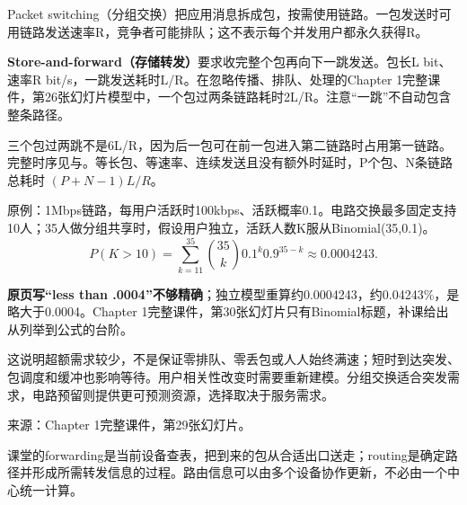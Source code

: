 



Packet switching（分组交换）把应用消息拆成包，按需使用链路。一包发送时可用链路发送速率R，竞争者可能排队；这不表示每个并发用户都永久获得R。


\textbf{Store-and-forward（存储转发）}要求收完整个包再向下一跳发送。包长L bit、速率R bit/s，一跳发送耗时L/R。在忽略传播、排队、处理的Chapter 1完整课件，第26张幻灯片模型中，一个包过两条链路耗时2L/R。注意“一跳”不自动包含整条路径。




三个包过两跳不是6L/R，因为后一包可在前一包进入第二链路时占用第一链路。完整时序见与。等长包、等速率、连续发送且没有额外时延时，P个包、N条链路总耗时 \((P+N-1)L/R\)。





原例：1Mbps链路，每用户活跃时100kbps、活跃概率0.1。电路交换最多固定支持10人；35人做分组共享时，假设用户独立，活跃人数K服从Binomial(35,0.1)。
\[
P(K>10)=\sum_{k=11}^{35}\binom{35}{k}0.1^k0.9^{35-k}\approx0.0004243.\tag{1.1}
\]


\textbf{原页写“less than .0004”不够精确}；独立模型重算约0.0004243，约0.04243\%，是略大于0.0004。Chapter 1完整课件，第30张幻灯片只有Binomial标题，补课给出从列举到公式的台阶。


这说明超额需求较少，不是保证零排队、零丢包或人人始终满速；短时到达突发、包调度和缓冲也影响等待。用户相关性改变时需要重新建模。分组交换适合突发需求，电路预留则提供更可预测资源，选择取决于服务需求。


来源：Chapter 1完整课件，第29张幻灯片。





课堂的forwarding是当前设备查表，把到来的包从合适出口送走；routing是确定路径并形成所需转发信息的过程。路由信息可以由多个设备协作更新，不必由一个中心统一计算。



